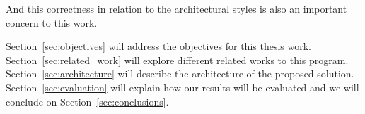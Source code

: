 And this correctness in relation to the architectural styles is also an important concern to this work.



Section~\ref{sec:objectives} will address the objectives for this thesis work. Section~\ref{sec:related_work} will explore different related works to this program. Section~\ref{sec:architecture} will describe the architecture of the proposed solution. Section~\ref{sec:evaluation} will explain how our results will be evaluated and we will conclude on Section~\ref{sec:conclusions}.


